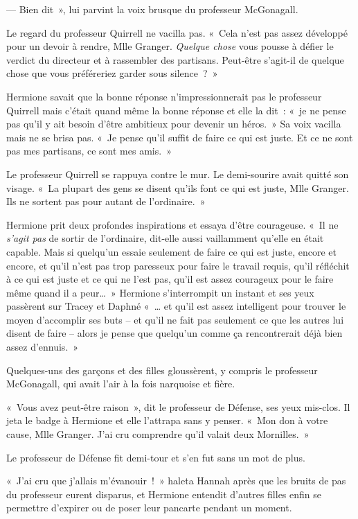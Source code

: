 --- Bien dit~», lui parvint la voix brusque du professeur McGonagall.

Le regard du professeur Quirrell ne vacilla pas. «~Cela n'est pas assez développé pour un devoir à rendre, Mlle Granger. \emph{Quelque chose} vous pousse à défier le verdict du directeur et à rassembler des partisans. Peut-être s'agit-il de quelque chose que vous préféreriez garder sous silence~?~»

Hermione savait que la bonne réponse n'impressionnerait pas le professeur Quirrell mais c'était quand même la bonne réponse et elle la dit~: «~je ne pense pas qu'il y ait besoin d'être ambitieux pour devenir un héros.~» Sa voix vacilla mais ne se brisa pas. «~Je pense qu'il suffit de faire ce qui est juste. Et ce ne sont pas mes partisans, ce sont mes amis.~»

Le professeur Quirrell se rappuya contre le mur. Le demi-sourire avait quitté son visage. «~La plupart des gens se disent qu'ils font ce qui est juste, Mlle Granger. Ils ne sortent pas pour autant de l'ordinaire.~»

Hermione prit deux profondes inspirations et essaya d'être courageuse. «~Il ne \emph{s'agit pas} de sortir de l'ordinaire, dit-elle aussi vaillamment qu'elle en était capable. Mais si quelqu'un essaie seulement de faire ce qui est juste, encore et encore, et qu'il n'est pas trop paresseux pour faire le travail requis, qu'il réfléchit à ce qui est juste et ce qui ne l'est pas, qu'il est assez courageux pour le faire même quand il a peur…~» Hermione s'interrompit un instant et ses yeux passèrent sur Tracey et Daphné «~… et qu'il est assez intelligent pour trouver le moyen d'accomplir ses buts -- et qu'il ne fait pas seulement ce que les autres lui disent de faire -- alors je pense que quelqu'un comme ça rencontrerait déjà bien assez d'ennuis.~»

Quelques-uns des garçons et des filles gloussèrent, y compris le professeur McGonagall, qui avait l'air à la fois narquoise et fière.

«~Vous avez peut-être raison~», dit le professeur de Défense, ses yeux mis-clos. Il jeta le badge à Hermione et elle l'attrapa sans y penser. «~Mon don à votre cause, Mlle Granger. J'ai cru comprendre qu'il valait deux Mornilles.~»

Le professeur de Défense fit demi-tour et s'en fut sans un mot de plus.

«~J'ai cru que j'allais m'évanouir~!~» haleta Hannah après que les bruits de pas du professeur eurent disparus, et Hermione entendit d'autres filles enfin se permettre d'expirer ou de poser leur pancarte pendant un moment.


